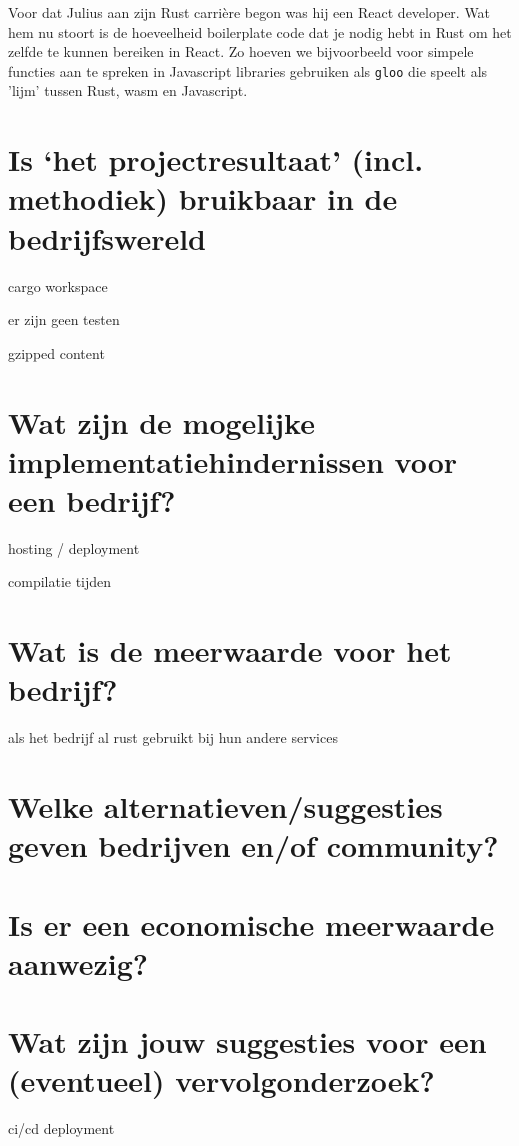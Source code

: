 Voor dat Julius aan zijn Rust carrière begon was hij een React developer. Wat hem nu stoort is de
hoeveelheid boilerplate code dat je nodig hebt in Rust om het zelfde te kunnen bereiken in React.
Zo hoeven we bijvoorbeeld voor simpele functies aan te spreken in Javascript libraries gebruiken als
\texttt{gloo} die speelt als 'lijm' tussen Rust, wasm en Javascript.


\section{Is ‘het projectresultaat’ (incl. methodiek) bruikbaar in de bedrijfswereld}

cargo workspace

er zijn geen testen

gzipped content


\section{Wat zijn de mogelijke implementatiehindernissen voor een bedrijf?}

hosting / deployment

compilatie tijden



\section{Wat is de meerwaarde voor het bedrijf?}

als het bedrijf al rust gebruikt bij hun andere services


\section{Welke alternatieven/suggesties geven bedrijven en/of community?}


\section{Is er een economische meerwaarde aanwezig?}


\section{Wat zijn jouw suggesties voor een (eventueel) vervolgonderzoek?}

ci/cd deployment

